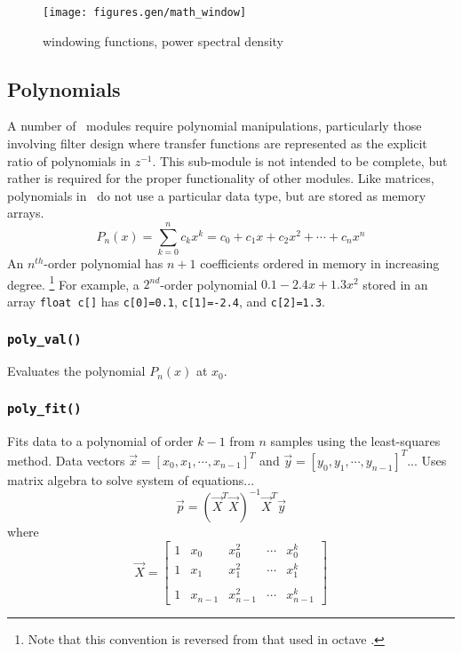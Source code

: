 \begin{figure}
\centering
  \texttt{[image: figures.gen/math\_window]}
\caption{windowing functions, power spectral density}
\label{fig:module:math:window}
\end{figure}

\subsection{Polynomials}
A number of \liquid\ modules require polynomial manipulations, particularly
those involving filter design where transfer functions are represented as the
explicit ratio of polynomials in $z^{-1}$.
This sub-module is not intended to be complete, but rather is required for
the proper functionality of other modules.
Like matrices, polynomials in \liquid\ do not use a particular data type, but
are stored as memory arrays.
\[
    P_n(x) = \sum_{k=0}^{n}{c_k x^k}
           = c_0 + c_1 x + c_2 x^2 + \cdots + c_n x^n
\]
An $n^{th}$-order polynomial has $n+1$ coefficients ordered in memory in
increasing degree.%
\footnote{Note that this convention is reversed from that used in octave
\cite{octave:web}.}
For example, a $2^{nd}$-order polynomial $0.1 -2.4x + 1.3x^2$ stored in an
array {\tt float c[]} has
{\tt c[0]=0.1},
{\tt c[1]=-2.4}, and
{\tt c[2]=1.3}.

\subsubsection{{\tt poly\_val()}}
Evaluates the polynomial $P_n(x)$ at $x_0$.

\subsubsection{{\tt poly\_fit()}}
Fits data to a polynomial of order $k-1$ from $n$ samples using the
least-squares method.
Data vectors
$\vec{x}=[x_0,x_1,\cdots,x_{n-1}]^T$ and 
$\vec{y}=[y_0,y_1,\cdots,y_{n-1}]^T$...
Uses matrix algebra to solve system of equations...
\[
    \vec{p} = \left(\vec{X}^T\vec{X}\right)^{-1}\vec{X}^T\vec{y}
\]
where
\[
    \vec{X} = 
    \begin{bmatrix}
        1   & x_0       & x_0^2     & \cdots    & x_0^{k}     \\
        1   & x_1       & x_1^2     & \cdots    & x_1^{k}     \\
        \\
        1   & x_{n-1}   & x_{n-1}^2 & \cdots    & x_{n-1}^{k}
    \end{bmatrix}
\]


